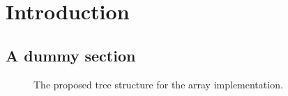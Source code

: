 %
%
\chapter{Introduction}

\section{A dummy section}

\begin{figure}[!h]
	\centering
	\caption{The proposed tree structure for the array implementation.}
\end{figure}


\clearpage
